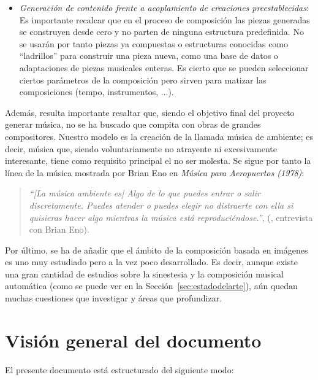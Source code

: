 \begin{itemize}
		\item \emph{Generación de contenido frente a acoplamiento de creaciones preestablecidas}:
			\vspace{0.1in}
			\\Es importante recalcar que en el proceso de composición las piezas generadas se construyen desde cero y no parten de ninguna estructura predefinida. No se usarán por tanto piezas ya compuestas o estructuras conocidas como ``ladrillos'' para construir una pieza nueva, como una base de datos o adaptaciones de piezas musicales enteras. Es cierto que se pueden seleccionar ciertos parámetros de la composición pero sirven para matizar las composiciones (tempo, instrumentos, ...).
		\end{itemize}
		
		Además, resulta importante resaltar que, siendo el objetivo final del proyecto generar música, no se ha buscado que compita con obras de grandes compositores. Nuestro modelo es la creación de la llamada música de ambiente; es decir, música que, siendo voluntariamente no atrayente ni excesivamente interesante, tiene como requisito principal el no ser molesta. Se sigue por tanto la línea de la música mostrada por Brian Eno en \emph{Música para Aeropuertos (1978)}:
		
		\begin{quote}
		\emph{``[La música ambiente es] Algo de lo que puedes entrar o salir discretamente. Puedes atender o puedes elegir no distraerte con ella si quisieras hacer algo mientras la música está reproduciéndose.''}, (\cite{BrianEnoInterview}, entrevista con Brian Eno).
		\end{quote}		
		
		Por último, se ha de añadir que el ámbito de la composición basada en imágenes es uno muy estudiado pero a la vez poco desarrollado. Es decir, aunque existe una gran cantidad de estudios sobre la sinestesia y la composición musical automática (como se puede ver en la Sección~\ref{sec:estadodelarte}), aún quedan muchas cuestiones que investigar y áreas que profundizar.\\




\section{Visión general del documento}

El presente documento está estructurado del siguiente modo:\\

